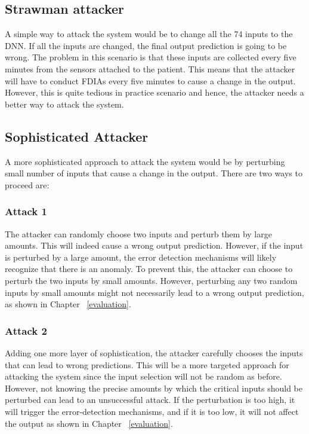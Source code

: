 \subsection{Strawman attacker}
A simple way to attack the system would be to change all the 74 inputs to the DNN.
 If all the inputs are changed, the final output prediction is going to be wrong. The problem in this  scenario is that 
 these inputs are collected every five minutes from the sensors attached to the patient. 
 This means that the attacker will have to conduct FDIAs every five minutes to cause a change in the output. 
 However, this is quite tedious in practice scenario and hence, the attacker needs a better way to attack the system. 

\subsection{Sophisticated Attacker}
A more sophisticated approach to attack the system would be by perturbing small number of inputs that cause a change in the output. 
There are two ways to proceed are:

\subsubsection{Attack 1}
The attacker can randomly choose two inputs and perturb them by large amounts. 
This will indeed cause a wrong output prediction. 
However, if the input is perturbed by a large amount, the error detection mechanisms will likely recognize that there is an anomaly. 
To prevent this, the attacker can choose to perturb the two inputs by small amounts. 
However, perturbing any two random inputs by small amounts might not necessarily lead to a wrong output prediction, as shown in Chapter ~\ref{evaluation}. 

\subsubsection{Attack 2}
Adding one more layer of sophistication, the attacker carefully chooses the inputs that can lead to wrong predictions. 
 This will be a more targeted approach for attacking the system since the input selection will not be random as before. 
However, not knowing the precise amounts by which the critical inputs should be perturbed can lead to an unsuccessful attack. 
If the perturbation is too high, it will trigger the error-detection mechanisms, 
and if it is too low, it will not affect the output as shown in Chapter ~\ref{evaluation}. 

